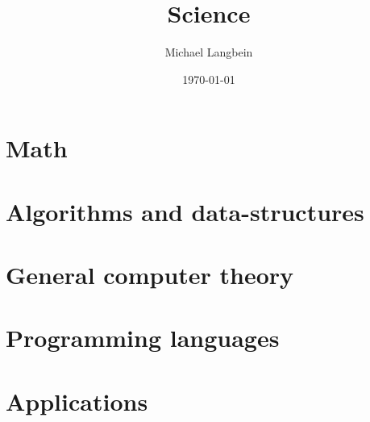 \documentclass{book}
\title{Science}
\author{Michael Langbein}
\date{\today}
\begin{document}
\maketitle
\tableofcontents

\chapter{Math}








%







%



\chapter{Algorithms and data-structures}



\chapter{General computer theory}









\chapter{Programming languages}









%

\chapter{Applications}










%


\begin{appendices}






\end{appendices}
\end{document}
